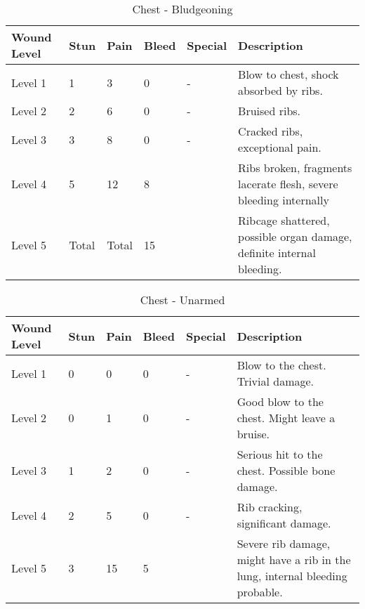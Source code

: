 \documentclass[oneside,11pt,english]{book}
\begin{document}
\begin{table}[hb] %
	\caption{Chest - Bludgeoning}
	\label{wound:Chest - Bludgeoning}
	\begin{tabu} to 
Wound Level &Stun &Pain &Bleed &Special &Description\\\toprule
Level 1& 1& 3& 0& - &Blow to chest, shock absorbed by ribs.\\
Level 2& 2& 6& 0& - &Bruised ribs.\\
Level 3& 3& 8& 0& - &Cracked ribs, exceptional pain. \\
Level 4& 5& 12& 8&  &Ribs broken, fragments lacerate flesh, severe bleeding internally\\
Level 5& Total& Total& 15 & &Ribcage shattered, possible organ damage, definite internal bleeding.\\
	\end{tabu}
\end{table}

\begin{table}[!hb] %
	\caption{Chest - Unarmed}
	\label{wound:Chest - Unarmed}
	\begin{tabu} to 
Wound Level &Stun &Pain &Bleed &Special &Description\\\toprule
Level 1& 0& 0& 0& - &Blow to the chest. Trivial damage.\\
Level 2& 0& 1& 0& - &Good blow to the chest. Might leave a bruise.\\
Level 3& 1& 2& 0& - &Serious hit to the chest. Possible bone damage.\\
Level 4& 2& 5& 0& - &Rib cracking, significant damage.\\
Level 5& 3& 15& 5&&Severe rib damage, might have a rib in the lung, internal bleeding probable.\\
	\end{tabu}
\end{table}
	\clearpage
\end{document}
